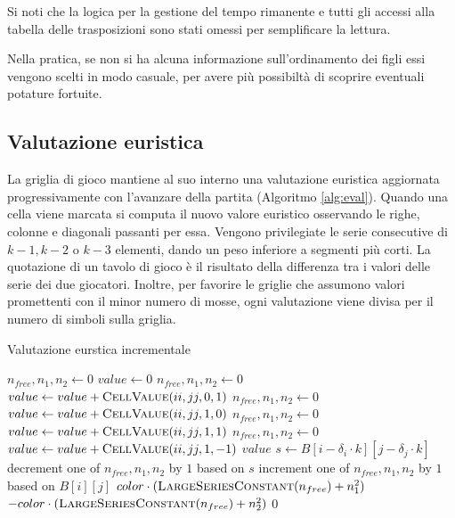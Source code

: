 \documentclass{article}
\begin{document}
Si noti che la logica per la gestione del tempo rimanente e tutti gli accessi
alla tabella delle trasposizioni sono stati omessi per semplificare la lettura.

Nella pratica, se non si ha alcuna informazione sull'ordinamento dei figli
essi vengono scelti in modo casuale, per avere pi\`u possibilt\`a di scoprire
eventuali potature fortuite.

\subsection{Valutazione euristica}

La griglia di gioco mantiene al suo interno una valutazione euristica 
aggiornata progressivamente con l'avanzare della partita (Algoritmo \vref{alg:eval}).
Quando una cella viene marcata si computa il nuovo valore euristico osservando
le righe, colonne e diagonali passanti per essa. Vengono privilegiate le serie consecutive 
di $k-1, k-2$ o $k-3$ elementi, dando un peso inferiore a segmenti pi\`u corti.
La quotazione di un tavolo di gioco \`e il risultato della differenza tra i
valori delle serie dei due giocatori. Inoltre, per favorire le griglie che
assumono valori promettenti con il minor numero di mosse, ogni
valutazione viene divisa per il numero di simboli sulla griglia.

\begin{algorithm}[H]
  \caption{Valutazione eurstica incrementale}
  \label{alg:eval}
  \begin{algorithmic}[0]
    \State $n_{free}, n_1, n_2 \gets 0$
      \State $value \gets 0$
      \State $n_{free}, n_1, n_2 \gets 0$
        \State $value \gets value + \Call{CellValue}{ii, jj, 0, 1}$
      \EndFor
      \State $n_{free}, n_1, n_2 \gets 0$
        \State $value \gets value + \Call{CellValue}{ii, jj, 1, 0}$
      \EndFor
      \State $n_{free}, n_1, n_2 \gets 0$
        \State $value \gets value + \Call{CellValue}{ii, jj, 1, 1}$
      \EndFor
      \State $n_{free}, n_1, n_2 \gets 0$
        \State $value \gets value + \Call{CellValue}{ii, jj, 1, -1}$
      \EndFor
      \State \Return $value$
    \EndProcedure
       
        \State $s \gets B[i - \delta_i \cdot k][j - \delta_j \cdot k]$ 
        \State decrement one of $n_{free}, n_1, n_2$ by $1$ based on $s$
      \EndIf
      \State increment one of $n_{free}, n_1, n_2$ by $1$ based on $B[i][j]$
      \Statex
        \State \Return $color \cdot (\Call{LargeSeriesConstant}{n_{free}} + n_1^2)$
        \State \Return $-color \cdot (\Call{LargeSeriesConstant}{n_{free}} + n_2^2)$
      \Else
        \State \Return $0$
      \EndIf
    \EndProcedure
  \end{algorithmic}
\end{algorithm}
\end{document}
